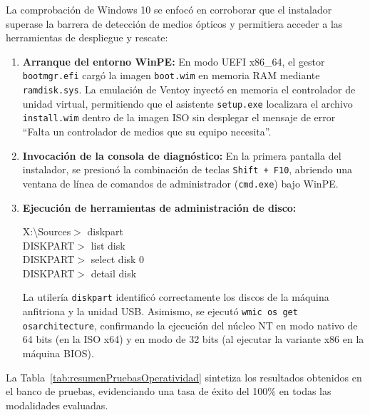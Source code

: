\documentclass[12pt]{article}
\begin{document}
La comprobación de Windows 10 se enfocó en corroborar que el instalador superase la barrera de detección de medios ópticos y permitiera acceder a las herramientas de despliegue y rescate:
\begin{enumerate}[noitemsep, topsep=2pt]
    \item \textbf{Arranque del entorno WinPE:} En modo UEFI x86\_64, el gestor \texttt{bootmgr.efi} cargó la imagen \texttt{boot.wim} en memoria RAM mediante \texttt{ramdisk.sys}. La emulación de Ventoy inyectó en memoria el controlador de unidad virtual, permitiendo que el asistente \texttt{setup.exe} localizara el archivo \texttt{install.wim} dentro de la imagen ISO sin desplegar el mensaje de error \enquote{Falta un controlador de medios que su equipo necesita}.
    \item \textbf{Invocación de la consola de diagnóstico:} En la primera pantalla del instalador, se presionó la combinación de teclas \texttt{Shift + F10}, abriendo una ventana de línea de comandos de administrador (\texttt{cmd.exe}) bajo WinPE.
    \item \textbf{Ejecución de herramientas de administración de disco:}
    \begin{mdframed}[style=terminal]
    \ttfamily\upshape\color{bashLetterColor}\footnotesize
    X:\textbackslash Sources$>$ diskpart \\
    DISKPART$>$ list disk \\
    DISKPART$>$ select disk 0 \\
    DISKPART$>$ detail disk
    \end{mdframed}
    La utilería \texttt{diskpart} identificó correctamente los discos de la máquina anfitriona y la unidad USB. Asimismo, se ejecutó \texttt{wmic os get osarchitecture}, confirmando la ejecución del núcleo NT en modo nativo de 64 bits (en la ISO x64) y en modo de 32 bits (al ejecutar la variante x86 en la máquina BIOS).
\end{enumerate}

La Tabla~\ref{tab:resumenPruebasOperatividad} sintetiza los resultados obtenidos en el banco de pruebas, evidenciando una tasa de éxito del 100\% en todas las modalidades evaluadas.
\end{document}
